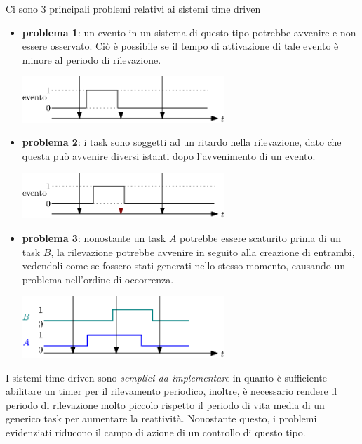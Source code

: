 \documentclass[10pt, letterpaper]{report}
\begin{document}
Ci sono 3 principali problemi relativi ai sistemi time driven\begin{itemize}
    \item \textbf{problema 1}: un evento in un sistema di questo tipo potrebbe avvenire e non essere osservato. Ciò è possibile se il tempo di attivazione di tale evento è minore al periodo di rilevazione.\begin{center}
        \includegraphics[width=0.6\textwidth ]{images/periodoRilevazione3.eps}
    \end{center}
    \item  \textbf{problema 2}: i task sono soggetti ad un ritardo nella rilevazione, dato che questa può avvenire diversi istanti dopo l'avvenimento di un evento.\begin{center}
        \includegraphics[width=0.6\textwidth ]{images/periodoRilevazione4.eps}
    \end{center}
    \item \textbf{problema 3}: nonostante un task $A$ potrebbe essere scaturito prima di un task $B$, la rilevazione potrebbe avvenire in seguito alla creazione di entrambi, vedendoli come se fossero stati generati nello stesso momento, causando un problema nell'ordine di occorrenza.\begin{center}
        \includegraphics[width=0.6\textwidth ]{images/periodoRilevazione5.eps}
    \end{center}
\end{itemize}
I sistemi time driven sono \textit{semplici da implementare} in quanto è sufficiente abilitare un timer per il rilevamento periodico, inoltre, è necessario rendere il periodo di rilevazione molto piccolo rispetto il periodo di vita media di un generico task per aumentare la reattività. Nonostante questo, i problemi evidenziati riducono il campo di azione di un controllo di questo tipo. 
\end{document}
